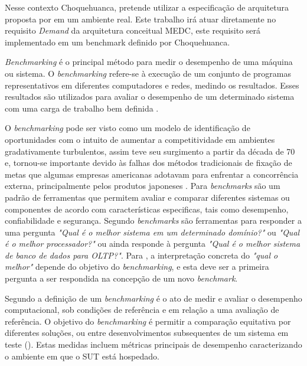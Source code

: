 Nesse contexto Choquehuanca, pretende utilizar a especificação de arquitetura proposta por \cite{Lourenco2015} em um ambiente real. Este trabalho irá atuar diretamente no requisito \textit{Demand} da arquitetura conceitual MEDC, este requisito será implementado em um benchmark definido por Choquehuanca.

\textit{Benchmarking} é o principal método para medir o desempenho de uma máquina ou sistema. O \textit{benchmarking} refere-se à execução de um conjunto de programas representativos em diferentes computadores e redes, medindo os resultados. Esses resultados são utilizados para avaliar o desempenho de um determinado sistema com uma carga de trabalho bem definida \cite{Menasce2001}.

O \textit{benchmarking} pode ser visto como um modelo de identificação de oportunidades com o intuito de aumentar a competitividade em ambientes gradativamente turbulentos, assim teve seu surgimento a partir da década de 70 e, tornou-se importante devido às falhas dos métodos tradicionais de fixação de metas que algumas empresas americanas adotavam para enfrentar a concorrência externa, principalmente pelos produtos japoneses \cite{Camila2008}. Para \cite{Marco2012} \textit{benchmarks} são um padrão de ferramentas que permitem avaliar e comparar diferentes sistemas ou componentes de acordo com características especificas, tais como desempenho, confiabilidade e segurança. Segundo \cite{Folkerts2013} \textit{benchmarks} são ferramentas para responder a uma pergunta \textit{"Qual é o melhor sistema em um determinado domínio?"} ou  \textit{"Qual é o melhor processador?"} ou ainda responde à pergunta \textit{"Qual é o melhor sistema de banco de dados para OLTP?"}. Para \cite{Folkerts2013}, a interpretação concreta do \textit{"qual o melhor"} depende do objetivo do \textit{benchmarking}, e esta deve ser a primeira pergunta a ser respondida na concepção de um novo \textit{benchmark}. 


Segundo \cite{Stefan2010} a definição de um \textit{benchmarking} é o ato de medir e avaliar o desempenho computacional, sob condições de referência e em relação a uma avaliação de referência. O objetivo do \textit{benchmarking} é permitir a comparação equitativa por diferentes soluções, ou entre desenvolvimentos subsequentes de um sistema em teste (). Estas medidas incluem métricas principais de desempenho caracterizando o ambiente em que o SUT está hospedado.

